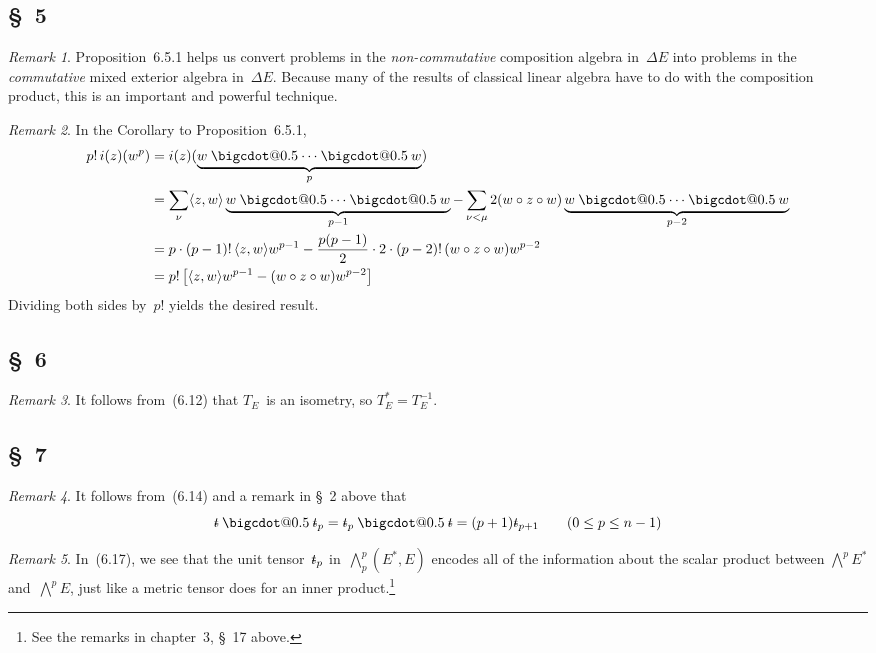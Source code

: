 \documentclass[letterpaper,12pt]{article}
\makeatletter
\newcommand{\bigcdot}[1]{\mathbin{\mathpalette\bigcdot@{#1}}}
\newcommand{\bigcdot@}[2]{%
  \sbox0{$#1\vcenter{}$}%
  \sbox2{$#1\cdot\m@th$}%
  \hbox{%
    \hfil
    \raise\ht0\hbox{%
      \scalebox{#2}{%
        \lower\ht0\hbox{$#1\bullet\m@th$}%
      }%
    }%
    \hfil
  }%
}
\newcommand{\after}{\circ}
\newcommand{\mult}{\cdot}
\newcommand{\bigeprod}{\bigwedge}
\newcommand{\medeprod}{{\textstyle\bigeprod}}
\newcommand{\mprod}{\bigcdot{0.5}}
\newcommand{\sprod}[2]{\langle#1,#2\rangle}
\newcommand{\multi}[4]{#2_{#3}#1\cdots#1#2_{#4}}
\newcommand{\mprods}[3]{\multi{\mprod}{#1}{#2}{#3}}
\newcommand{\stroked}[1]{\mathrlap{\text{\kern0.05em-}}#1}
\newcommand{\unit}{\stroked{t}}
\theoremstyle{definition}
\theoremstyle{remark}
\newtheorem*{rmk}{Remark}
\makeatother
\begin{document}
\subsection*{\S~5}
\begin{rmk}
Proposition~6.5.1 helps us convert problems in the \emph{non-commutative} composition algebra in~\(\Delta E\) into problems in the \emph{commutative} mixed exterior algebra in~\(\Delta E\). Because many of the results of classical linear algebra have to do with the composition product, this is an important and powerful technique.
\end{rmk}

\begin{rmk}
In the Corollary to Proposition~6.5.1,
\begin{align*}
p!\,i(z)(w^p)&=i(z)(\underbrace{\mprods{w}{}{}}_p)\\
	&=\sum_{\nu}\sprod{z}{w}\underbrace{\mprods{w}{}{}}_{p-1}-\sum_{\nu<\mu}2(w\after z\after w)\underbrace{\mprods{w}{}{}}_{p-2}\\
	&=p\mult(p-1)!\,\sprod{z}{w}w^{p-1}-\frac{p(p-1)}{2}\mult 2\mult(p-2)!\,(w\after z\after w)w^{p-2}\\
	&=p!\,\bigl[\sprod{z}{w}w^{p-1}-(w\after z\after w)w^{p-2}\bigr]
\end{align*}
Dividing both sides by~\(p!\) yields the desired result.
\end{rmk}

\subsection*{\S~6}
\begin{rmk}
It follows from~(6.12) that \(T_E\)~is an isometry, so \(T_E^*=T_E^{-1}\).
\end{rmk}

\subsection*{\S~7}
\begin{rmk}
It follows from~(6.14) and a remark in \S~2 above that
\[\unit\mprod\unit_p=\unit_p\mprod\unit=(p+1)\unit_{p+1}\qquad(0\le p\le n-1)\]
\end{rmk}

\begin{rmk}
In~(6.17), we see that the unit tensor~\(\unit_p\) in~\(\medeprod^p_p(E^*,E)\) encodes all of the information about the scalar product between \(\medeprod^p E^*\) and~\(\medeprod^p E\), just like a metric tensor does for an inner product.\footnote{See the remarks in chapter~3, \S~17 above.}
\end{rmk}
\end{document}
